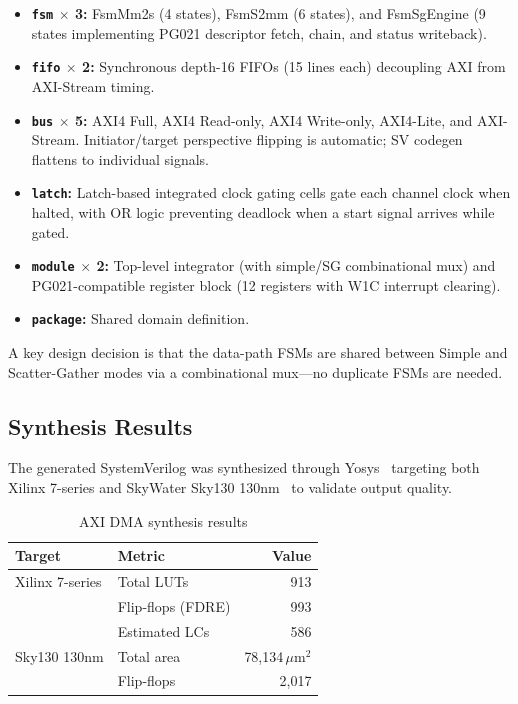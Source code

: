 \documentclass[11pt,twocolumn]{article}
\begin{document}
\begin{itemize}
\item \textbf{\texttt{fsm} $\times$ 3:} FsmMm2s (4 states), FsmS2mm (6 states), and FsmSgEngine (9 states implementing PG021 descriptor fetch, chain, and status writeback).
\item \textbf{\texttt{fifo} $\times$ 2:} Synchronous depth-16 FIFOs (15 lines each) decoupling AXI from AXI-Stream timing.
\item \textbf{\texttt{bus} $\times$ 5:} AXI4 Full, AXI4 Read-only, AXI4 Write-only, AXI4-Lite, and AXI-Stream. Initiator/target perspective flipping is automatic; SV codegen flattens to individual signals.
\item \textbf{\texttt{latch}:} Latch-based integrated clock gating cells gate each channel clock when halted, with OR logic preventing deadlock when a start signal arrives while gated.
\item \textbf{\texttt{module} $\times$ 2:} Top-level integrator (with simple/SG combinational mux) and PG021-compatible register block (12 registers with W1C interrupt clearing).
\item \textbf{\texttt{package}:} Shared domain definition.
\end{itemize}

A key design decision is that the data-path FSMs are shared between Simple and Scatter-Gather modes via a combinational mux---no duplicate FSMs are needed.

\subsection{Synthesis Results}

The generated SystemVerilog was synthesized through Yosys~\cite{yosys} targeting both Xilinx 7-series and SkyWater Sky130 130nm~\cite{sky130pdk} to validate output quality.

\begin{table}[t]
\centering
\caption{AXI DMA synthesis results}
\label{tab:dmasyn}
\footnotesize
\begin{tabular}{@{}llr@{}}
\toprule
\textbf{Target} & \textbf{Metric} & \textbf{Value} \\
\midrule
Xilinx 7-series & Total LUTs & 913 \\
                & Flip-flops (FDRE) & 993 \\
                & Estimated LCs & 586 \\
\midrule
Sky130 130nm    & Total area & 78,134\,$\mu$m$^2$ \\
                & Flip-flops & 2,017 \\
\bottomrule
\end{tabular}
\end{table}
\end{document}
